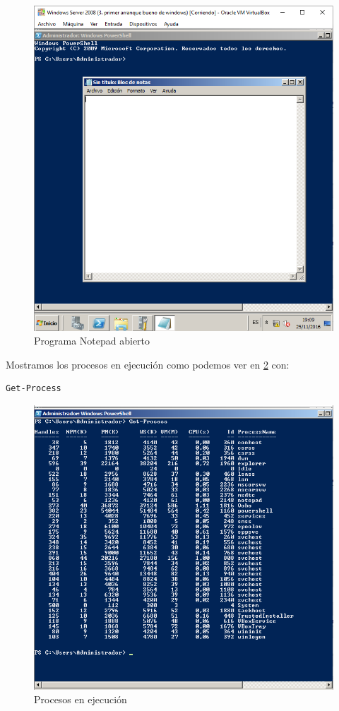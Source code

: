 \begin{figure}[H]
	\centering
	\includegraphics[scale=0.6]{notepad-abierto.png}
	\caption{Programa Notepad abierto} \label{notepad-abierto}
\end{figure}

Mostramos los procesos en ejecución como podemos ver en \ref{procesos-ejecucion} con:

\begin{verbatim}
Get-Process
\end{verbatim}

\begin{figure}[H]
	\centering
	\includegraphics[scale=0.6]{procesos-ejecucion.png}
	\caption{Procesos en ejecución} \label{procesos-ejecucion}
\end{figure}

